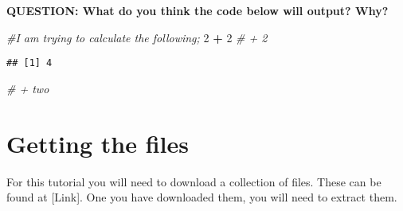 \documentclass[]{book}
\newenvironment{Shaded}{\begin{snugshade}}{\end{snugshade}}
\newcommand{\CommentTok}[1]{\textcolor[rgb]{0.56,0.35,0.01}{\textit{#1}}}
\newcommand{\DecValTok}[1]{\textcolor[rgb]{0.00,0.00,0.81}{#1}}
\newcommand{\OperatorTok}[1]{\textcolor[rgb]{0.81,0.36,0.00}{\textbf{#1}}}
\newcommand{\StringTok}[1]{\textcolor[rgb]{0.31,0.60,0.02}{#1}}
\begin{document}
\textbf{QUESTION: What do you think the code below will output? Why?}

\begin{Shaded}
\begin{Highlighting}[]
\CommentTok{#I am trying to calculate the following;}
\DecValTok{2} \OperatorTok{+}\StringTok{ }\DecValTok{2} \CommentTok{# + 2}
\end{Highlighting}
\end{Shaded}

\begin{verbatim}
## [1] 4
\end{verbatim}

\begin{Shaded}
\begin{Highlighting}[]
\CommentTok{# + two}
\end{Highlighting}
\end{Shaded}

\hypertarget{getting-the-files}{%
\section{Getting the files}\label{getting-the-files}}

For this tutorial you will need to download a collection of files. These can be found at {[}Link{]}. One you have downloaded them, you will need to extract them.


\end{document}
